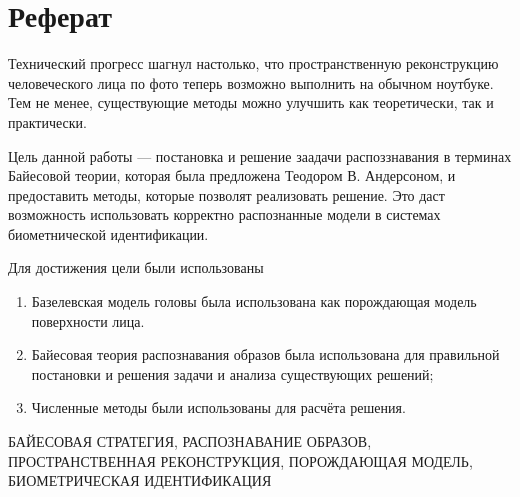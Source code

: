 \chapter*{Реферат}

Технический прогресс шагнул настолько,
что пространственную реконструкцию человеческого лица по фото
теперь возможно выполнить на обычном ноутбуке.
Тем не менее,
существующие методы можно улучшить как теоретически, так и практически.

Цель данной работы --- постановка и решение заадачи распоззнавания
в терминах Байесовой теории, которая была предложена Теодором В. Андерсоном,
и предоставить методы, которые позволят реализовать решение.
Это даст возможность использовать корректно распознанные модели
в системах биометнической идентификации.

Для достижения цели были использованы
\begin{enumerate}
  \item
    Базелевская модель головы была использована
    как порождающая модель поверхности лица.
  \item
    Байесовая теория распознавания образов была использована
    для правильной постановки и решения задачи и анализа существующих решений;
  \item
    Численные методы были использованы для расчёта решения.
\end{enumerate}

\MakeUppercase{Байесовая стратегия, распознавание образов,
пространственная реконструкция, порождающая модель,
биометрическая идентификация}
